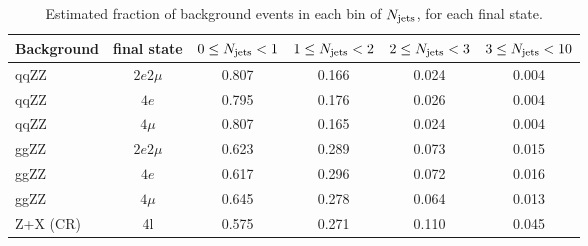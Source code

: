 
\begin{table}[!h!tb]  
\begin{center}  
\small  
    \caption{  
        Estimated fraction of background events in each bin of $N_{\rm jets}$, for each final state.  
\label{tab:fractions_njets_reco_pt30_eta4p7}  
}  
\begin{tabular}{|l|c|c|c|c|c|}  
\hline  
Background & final state & $0\leq N_{\rm jets} <1$ & $1\leq N_{\rm jets} <2$ & $2\leq N_{\rm jets} <3$ & $3\leq N_{\rm jets}<10$ \\ \hline  
qqZZ& $2e2\mu$  & 0.807  & 0.166  & 0.024  & 0.004  \\  
qqZZ& $4e$  & 0.795  & 0.176  & 0.026  & 0.004  \\  
qqZZ& $4\mu$  & 0.807  & 0.165  & 0.024  & 0.004  \\  
ggZZ& $2e2\mu$  & 0.623  & 0.289  & 0.073  & 0.015  \\  
ggZZ& $4e$  & 0.617  & 0.296  & 0.072  & 0.016  \\  
ggZZ& $4\mu$  & 0.645  & 0.278  & 0.064  & 0.013  \\  
Z+X (CR)& 4l  & 0.575  & 0.271  & 0.110  & 0.045  \\  
\hline  
\end{tabular}  
\normalsize  
\end{center}  
\end{table}  

